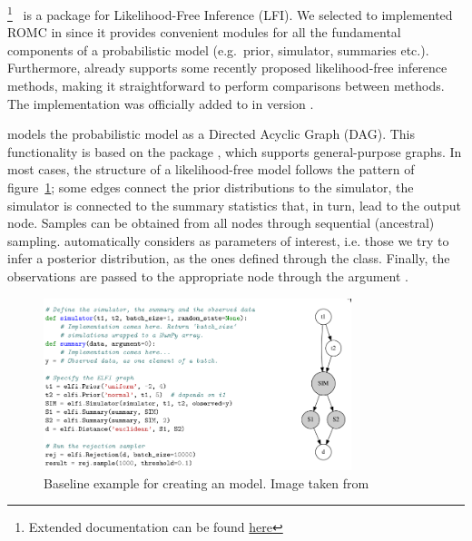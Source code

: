 \footnote{Extended
  documentation can be found
  \href{https://elfi.readthedocs.io/en/latest/}{here}}~\cite{1708.00707}
is a  package for Likelihood-Free Inference (LFI). We
selected to implemented ROMC in  since it provides
convenient modules for all the fundamental components of a
probabilistic model (e.g.\ prior, simulator, summaries
etc.). Furthermore,  already supports some recently proposed
likelihood-free inference methods, making it straightforward to
perform comparisons between methods. The implementation was officially
added to  in version .


 models the probabilistic model as a Directed Acyclic Graph
(DAG). This functionality is based on the package ,
which supports general-purpose graphs. In most cases, the structure of
a likelihood-free model follows the pattern of figure~\ref{fig:elfi};
some edges connect the prior distributions to the simulator, the
simulator is connected to the summary statistics that, in turn, lead
to the output node. Samples can be obtained from all nodes through
sequential (ancestral) sampling.  automatically considers as
parameters of interest, i.e. those we try to infer a posterior
distribution, as the ones defined through the 
class. Finally, the observations are passed to the appropriate node
through the argument
.

\begin{figure}[ht]
    \begin{center}
      \includegraphics[width=0.8\textwidth]{./latex_files/images/chapter2/elfi.png}
    \end{center}
    \caption[Baseline example for creating an  model]{Baseline example for creating an  model. Image taken from \cite{1708.00707}}
    \label{fig:elfi}
\end{figure}

